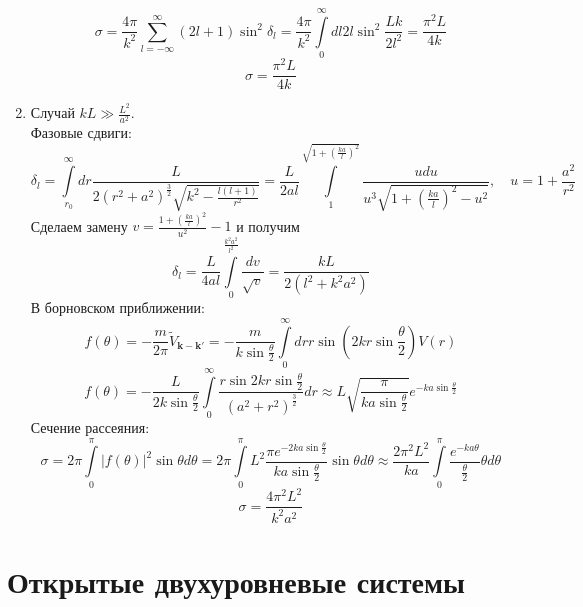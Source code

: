 \documentclass[12pt]{article}
\theoremstyle{definition}
\begin{document}
\begin{enumerate}
    \begin{equation}
        \sigma=\frac{4\pi}{k^2}\sum\limits_{l=-\infty}^{\infty}(2l+1)\sin^2\delta_l=\frac{4\pi}{k^2}\int\limits_0^{\infty}dl2l\sin^2\frac{Lk}{2l^2}=\frac{\pi^2L}{4k}
    \end{equation}
    \begin{equation}
        \boxed{\sigma=\frac{\pi^2L}{4k}}
    \end{equation}
    \item Случай $kL\gg\frac{L^2}{a^2}$.\\
    Фазовые сдвиги:
    \begin{equation}
        \delta_l=\int\limits_{r_0}^\infty dr\frac{L}{2(r^2+a^2)^\frac{3}{2}\sqrt{k^2-\frac{l(l+1)}{r^2}}}=\frac{L}{2al}\int\limits_1^{\sqrt{1+(\frac{ka}{l})^2}}\frac{udu}{u^3\sqrt{1+(\frac{ka}{l})^2-u^2}},\quad u=1+\frac{a^2}{r^2}
    \end{equation}
    Сделаем замену $v=\frac{1+(\frac{ka}{l})^2}{u^2}-1$ и получим
    \begin{equation}
        \delta_l=\frac{L}{4al}\int\limits_0^{\frac{k^2a^2}{l^2}}\frac{dv}{\sqrt{v}}=\frac{kL}{2(l^2+k^2a^2)}
    \end{equation}
    В борновском приближении:
    \begin{equation}
        f(\theta)=-\frac{m}{2\pi}\tilde{V}_{\textbf{k}-\textbf{k}'}=-\frac{m}{k\sin\frac{\theta}{2}}\int\limits_0^\infty drr\sin\left(2kr\sin\frac{\theta}{2}\right)V(r)
    \end{equation}
    \begin{equation}
        f(\theta)=-\frac{L}{2k\sin\frac{\theta}{2}}\int\limits_0^\infty\frac{r\sin2kr\sin\frac{\theta}{2}}{(a^2+r^2)^\frac{3}{2}}dr\approx L\sqrt{\frac{\pi}{ka\sin\frac{\theta}{2}}}e^{-ka\sin\frac{\theta}{2}}
    \end{equation}
    Сечение рассеяния:
    \begin{equation}
        \sigma=2\pi\int\limits_0^\pi|f(\theta)|^2\sin\theta d\theta=2\pi\int\limits_0^\pi L^2\frac{\pi e^{-2ka\sin\frac{\theta}{2}}}{ka\sin\frac{\theta}{2}}\sin\theta d\theta\approx\frac{2\pi^2 L^2}{ka}\int\limits_0^\pi\frac{e^{-ka\theta}}{\frac{\theta}{2}}\theta d\theta
    \end{equation}
    \begin{equation}
        \boxed{\sigma=\frac{4\pi^2L^2}{k^2a^2}}
    \end{equation}
\end{enumerate}
\section{Открытые двухуровневые системы}
\end{document}

